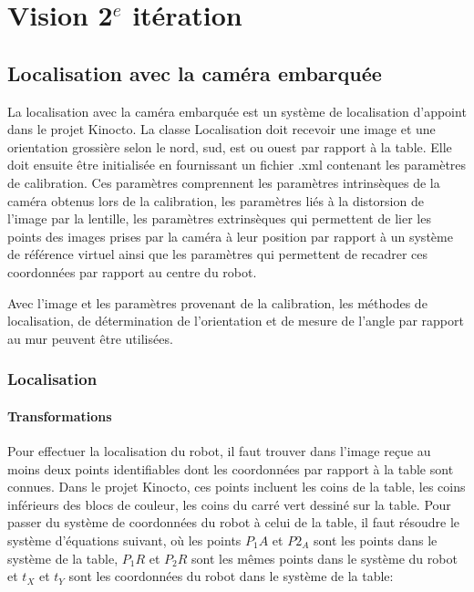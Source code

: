 


\chapter{Vision 2$^e$ itération}
\label{vision2}

\section{Localisation avec la caméra embarquée}

La localisation avec la caméra embarquée est un système de localisation d'appoint dans le projet Kinocto. La classe Localisation doit recevoir une image et une orientation grossière selon le nord, sud, est ou ouest par rapport à la table. Elle doit ensuite être initialisée en fournissant un fichier .xml contenant les paramètres de calibration. Ces paramètres comprennent les paramètres intrinsèques de la caméra obtenus lors de la calibration, les paramètres liés à la distorsion de l'image par la lentille, les paramètres extrinsèques qui permettent de lier les points des images prises par la caméra à leur position par rapport à un système de référence virtuel ainsi que les paramètres qui permettent de recadrer ces coordonnées par rapport au centre du robot.

Avec l'image et les paramètres provenant de la calibration, les méthodes de localisation, de détermination de l'orientation et de mesure de l'angle par rapport au mur peuvent être utilisées.

\subsection{Localisation}

\subsubsection{Transformations}

Pour effectuer la localisation du robot, il faut trouver dans l'image reçue au moins deux points identifiables dont les coordonnées par rapport à la table sont connues. Dans le projet Kinocto, ces points incluent les coins de la table, les coins inférieurs des blocs de couleur, les coins du carré vert dessiné sur la table. Pour passer du système de coordonnées du robot à celui de la table, il faut résoudre le système d'équations suivant, où les points $P_1A$ et $P2_A$ sont les points dans le système de la table, $P_1R$ et $P_2R$ sont les mêmes points dans le système du robot et $t_X$ et $t_Y$ sont les coordonnées du robot dans le système de la table:

